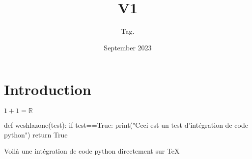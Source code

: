 \documentclass{article}
\title{V1}
\author{Tag. }
\date{September 2023}
\begin{document}
\maketitle

\section{Introduction}
$1+1=\mathbb{R}$
\begin{python}
def weshlazone(test):
    if test==True:
        print("Ceci est un test d'intégration de code python")
    return True
\end{python}
Voilà une intégration de code python directement sur TeX
\end{document}
